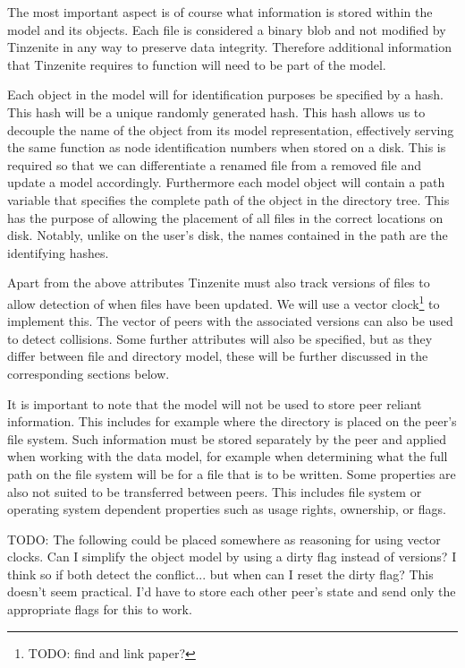The most important aspect is of course what information is stored within the model and its objects.
Each file is considered a binary blob and not modified by Tinzenite in any way to preserve data integrity.
Therefore additional information that Tinzenite requires to function will need to be part of the model.

Each object in the model will for identification purposes be specified by a hash.
This hash will be a unique randomly generated hash.
This hash allows us to decouple the name of the object from its model representation, effectively serving the same function as node identification numbers when stored on a disk.
This is required so that we can differentiate a renamed file from a removed file and update a model accordingly.
Furthermore each model object will contain a path variable that specifies the complete path of the object in the directory tree.
This has the purpose of allowing the placement of all files in the correct locations on disk.
Notably, unlike on the user's disk, the names contained in the path are the identifying hashes.

Apart from the above attributes Tinzenite must also track versions of files to allow detection of when files have been updated.
We will use a vector clock\footnote{TODO: find and link paper?} to implement this.
The vector of peers with the associated versions can also be used to detect collisions.
Some further attributes will also be specified, but as they differ between file and directory model, these will be further discussed in the corresponding sections below.

It is important to note that the model will not be used to store peer reliant information.
This includes for example where the directory is placed on the peer's file system.
Such information must be stored separately by the peer and applied when working with the data model, for example when determining what the full path on the file system will be for a file that is to be written.
Some properties are also not suited to be transferred between peers.
This includes file system or operating system dependent properties such as usage rights, ownership, or flags.

TODO: The following could be placed somewhere as reasoning for using vector clocks.
Can I simplify the object model by using a dirty flag instead of versions?
I think so if both detect the conflict... but when can I reset the dirty flag?
This doesn't seem practical.
I'd have to store each other peer's state and send only the appropriate flags for this to work.

